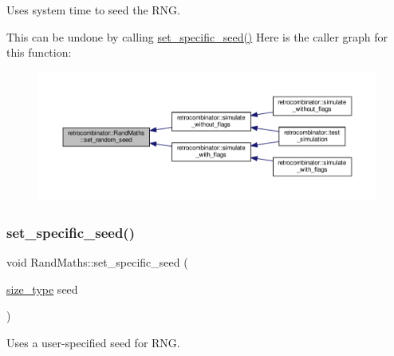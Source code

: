 Uses system time to seed the R\+NG. 

This can be undone by calling {\ttfamily \hyperlink{classretrocombinator_1_1RandMaths_a0bf1c2e7a1eccb1f9246b3fceeb5db8a}{set\+\_\+specific\+\_\+seed()}} Here is the caller graph for this function\+:
\nopagebreak
\begin{figure}[H]
\begin{center}
\leavevmode
\includegraphics[width=350pt]{classretrocombinator_1_1RandMaths_a2b61e31de6067ffa35531d5bde40f4c6_icgraph}
\end{center}
\end{figure}
\mbox{\label{classretrocombinator_1_1RandMaths_a0bf1c2e7a1eccb1f9246b3fceeb5db8a}} 
\subsubsection{\texorpdfstring{set\+\_\+specific\+\_\+seed()}{set\_specific\_seed()}}
{\footnotesize\ttfamily void Rand\+Maths\+::set\+\_\+specific\+\_\+seed (\begin{DoxyParamCaption}\item[{\hyperlink{namespaceretrocombinator_a8e1541b50cee66a791df4c437ccbb385}{size\+\_\+type}}]{seed }\end{DoxyParamCaption})}



Uses a user-\/specified seed for R\+NG. 

